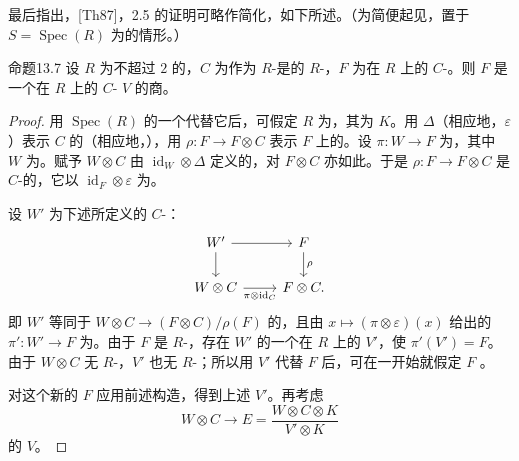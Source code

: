 最后指出，[Th87]，2.5 的证明可略作简化，如下所述。（为简便起见，置于 $S=\operatorname{Spec}(R)$ 为的情形。）

\begin{SGAresult}{命题}{13.7}
设 $R$ 为不超过 $2$ 的，$C$ 为作为 $R$-是的 $R$-，$F$ 为在 $R$ 上的 $C$-。则 $F$ 是一个在 $R$ 上的 $C$- $V$ 的商。
\end{SGAresult}
\begin{proof}
用 $\operatorname{Spec}(R)$ 的一个代替它后，可假定 $R$ 为，其为 $K$。用 $\Delta$（相应地，$\varepsilon$）表示 $C$ 的（相应地，），用 $\rho:F\to F\otimes C$ 表示 $F$ 上的。设 $\pi:W\to F$ 为，其中 $W$ 为。赋予 $W\otimes C$ 由 $\operatorname{id}_W\otimes\Delta$ 定义的，对 $F\otimes C$ 亦如此。于是 $\rho:F\to F\otimes C$ 是 $C$-的，它以 $\operatorname{id}_F\otimes\varepsilon$ 为。

设 $W'$ 为下述所定义的 $C$-：
\[
\begin{tikzcd}
W' \arrow[r] \arrow[d] & F \arrow[d,"\rho"]\\
W\otimes C \arrow[r,"\pi\otimes\operatorname{id}_C"'] & F\otimes C .
\end{tikzcd}
\]
即 $W'$ 等同于 $W\otimes C\to(F\otimes C)/\rho(F)$ 的，且由 $x\mapsto(\pi\otimes\varepsilon)(x)$ 给出的 $\pi':W'\to F$ 为。由于 $F$ 是 $R$-，存在 $W'$ 的一个在 $R$ 上的 $V'$，使 $\pi'(V')=F$。由于 $W\otimes C$ 无 $R$-，$V'$ 也无 $R$-；所以用 $V'$ 代替 $F$ 后，可在一开始就假定 $F$ 。

对这个新的 $F$ 应用前述构造，得到上述 $V'$。再考虑
\[
W\otimes C\longrightarrow E=\frac{W\otimes C\otimes K}{V'\otimes K}
\]
的 $V$。


\end{proof}

